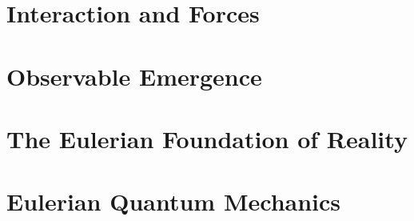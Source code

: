\documentclass[12pt, oneside]{book}
\theoremstyle{definition}
\begin{document}
\part{Interaction and Forces}










\part{Observable Emergence}








\part{The Eulerian Foundation of Reality}







\part{Eulerian Quantum Mechanics}








\end{document}
